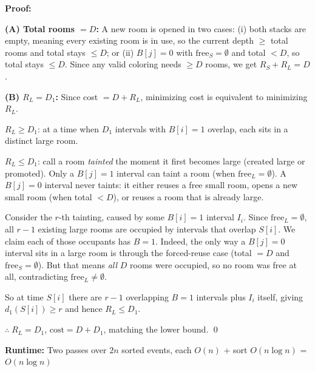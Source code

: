 \documentclass[11pt]{article}
\begin{document}
\textbf{Proof:}

\textbf{(A) Total rooms $= D$:}
A new room is opened in two cases: (i) both stacks are empty, meaning every existing room is in use, so the current depth $\ge$ total rooms and total stays $\le D$; or (ii) $B[j]=0$ with $\mathrm{free}_S = \emptyset$ and total $< D$, so total stays $\le D$.
Since any valid coloring needs $\ge D$ rooms, we get $R_S + R_L = D$.

\textbf{(B) $R_L = D_1$:}
Since cost $= D + R_L$, minimizing cost is equivalent to minimizing $R_L$.

$R_L \ge D_1$: at a time when $D_1$ intervals with $B[i]=1$ overlap, each sits in a distinct large room.

$R_L \le D_1$: call a room \emph{tainted} the moment it first becomes large (created large or promoted). Only a $B[j]=1$ interval can taint a room (when $\mathrm{free}_L = \emptyset$). A $B[j]=0$ interval never taints: it either reuses a free small room, opens a new small room (when total $< D$), or reuses a room that is already large.

Consider the $r$-th tainting, caused by some $B[i]=1$ interval $I_i$. Since $\mathrm{free}_L = \emptyset$, all $r-1$ existing large rooms are occupied by intervals that overlap $S[i]$.
We claim each of those occupants has $B=1$. Indeed, the only way a $B[j]=0$ interval sits in a large room is through the forced-reuse case (total $= D$ and $\mathrm{free}_S = \emptyset$). But that means \emph{all} $D$ rooms were occupied, so no room was free at all, contradicting $\mathrm{free}_L \ne \emptyset$.

So at time $S[i]$ there are $r-1$ overlapping $B=1$ intervals plus $I_i$ itself, giving $d_1(S[i]) \ge r$ and hence $R_L \le D_1$.

$\therefore\; R_L = D_1$, \quad $\text{cost} = D + D_1$, matching the lower bound. \qed

\textbf{Runtime:} Two passes over $2n$ sorted events, each $O(n)$ + sort $O(n \log n)$ = $\boxed{O(n \log n)}$
\end{document}
